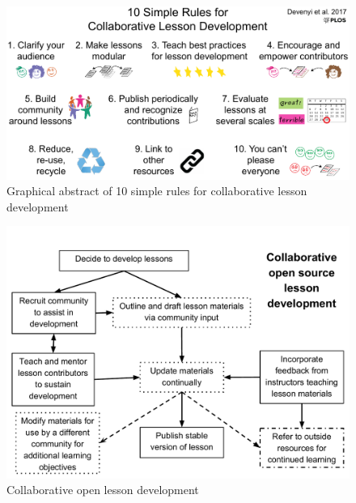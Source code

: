 \documentclass[10pt,letterpaper]{article}
\begin{document}
\newpage

\begin{figure}[ht]  %
\includegraphics[width=\linewidth]{figure1}
\caption{Graphical abstract of 10 simple rules for collaborative lesson development}
\label{figure1}
\end{figure}

\newpage

\begin{figure}[ht]  %
\includegraphics[width=\linewidth]{figure2}
\caption{Collaborative open lesson development}
\label{figure2}
\end{figure}

\newpage
\end{document}
